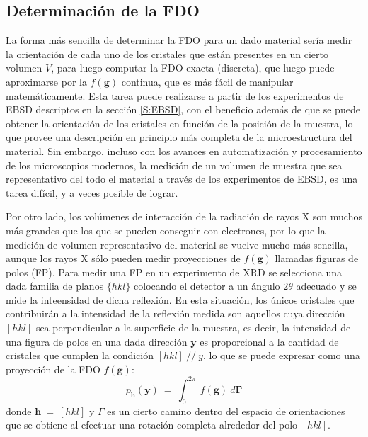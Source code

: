 \subsection{Determinación de la FDO}\label{SS:FDO}
La forma más sencilla de determinar la FDO para un dado material sería medir la orientación de cada uno de los cristales que están presentes en un cierto volumen $V$, para luego computar la FDO exacta (discreta), que luego puede aproximarse por la $f(\mathbf{g})$ continua, que es más fácil de manipular matemáticamente.
Esta tarea puede realizarse a partir de los experimentos de EBSD descriptos en la sección \ref{S:EBSD}, con el beneficio además de que se puede obtener la orientación de los cristales en función de la posición de la muestra, lo que provee una descripción en principio más completa de la microestructura del material.
Sin embargo, incluso con los avances en automatización y procesamiento de los microscopios modernos, la medición de un volumen de muestra que sea representativo del todo el material a través de los experimentos de EBSD, es una tarea difícil, y a veces posible de lograr.

Por otro lado, los volúmenes de interacción de la radiación de rayos X son muchos más grandes que los que se pueden conseguir con electrones, por lo que la medición de volumen representativo del material se vuelve mucho más sencilla, aunque los rayos X sólo pueden medir proyecciones de $f(\mathbf{g})$ llamadas figuras de polos (FP).
Para medir una FP en un experimento de XRD se selecciona una dada familia de planos $\{hkl\}$ colocando el detector a un ángulo $2\theta$ adecuado y se mide la inteensidad de dicha reflexión.
En esta situación, los únicos cristales que contribuirán a la intensidad de la reflexión medida son aquellos cuya dirección $[hkl]$ sea perpendicular a la superficie de la muestra, es decir, la intensidad de una figura de polos en una dada dirección $\mathbf{y}$ es proporcional a la cantidad de cristales que cumplen la condición $[hkl] \ // \ y$, lo que se puede expresar como una proyección de la FDO $f(\mathbf{g})$:
\begin{equation}
  p_{\mathbf{h}}(\mathbf{y}) \ = \ \int_{0}^{2\pi} \ f(\mathbf{g}) \ d\mathbf{\Gamma}
  \label{eq:PDF}
\end{equation}
\noindent
donde $\mathbf{h} \ = \ [hkl]$ y $\Gamma$ es un cierto camino dentro del espacio de orientaciones que se obtiene al efectuar una rotación completa alrededor del polo $[hkl]$.

